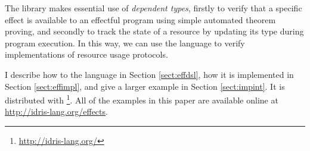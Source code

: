 \noindent
The library makes essential use of \emph{dependent types}, firstly to verify
that a specific effect is available to an effectful program using simple
automated theorem proving, and secondly to track the state of a resource by
updating its type during program execution. In this way, we can use the \Eff{}
language to verify implementations of resource usage protocols.

I describe how to  the \Eff{} language in Section \ref{sect:effdsl},
how it is implemented in Section \ref{sect:effimpl}, and give a larger example
in Section \ref{sect:impint}. It is distributed with
\Idris{}\footnote{\url{http://idris-lang.org/}}. All of the examples in this
paper are available online at \url{http://idris-lang.org/effects}.










